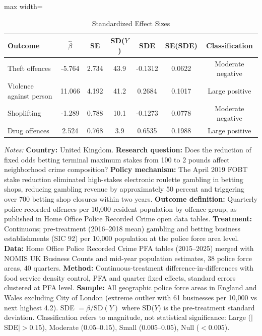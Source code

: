 \begin{table}[htbp]
\centering
\caption{Standardized Effect Sizes}
\label{tab:sde}
\begin{threeparttable}
\begin{adjustbox}{max width=\textwidth}
\begin{tabular}{lcccccc}
\toprule
Outcome & $\hat{\beta}$ & SE & SD($Y$) & SDE & SE(SDE) & Classification \\
\midrule
Theft offences & -5.764 & 2.734 & 43.9 & -0.1312 & 0.0622 & Moderate negative \\
Violence against person & 11.066 & 4.192 & 41.2 & 0.2684 & 0.1017 & Large positive \\
Shoplifting & -1.289 & 0.788 & 10.1 & -0.1273 & 0.0778 & Moderate negative \\
Drug offences & 2.524 & 0.768 & 3.9 & 0.6535 & 0.1988 & Large positive \\
\bottomrule
\end{tabular}
\end{adjustbox}
\begin{tablenotes}[flushleft]\footnotesize
\item \textit{Notes:} \textbf{Country:} United Kingdom. \textbf{Research question:} Does the reduction of fixed odds betting terminal maximum stakes from 100 to 2 pounds affect neighborhood crime composition? \textbf{Policy mechanism:} The April 2019 FOBT stake reduction eliminated high-stakes electronic roulette gambling in betting shops, reducing gambling revenue by approximately 50 percent and triggering over 700 betting shop closures within two years. \textbf{Outcome definition:} Quarterly police-recorded offences per 10,000 resident population by offence group, as published in Home Office Police Recorded Crime open data tables. \textbf{Treatment:} Continuous; pre-treatment (2016--2018 mean) gambling and betting business establishments (SIC 92) per 10,000 population at the police force area level. \textbf{Data:} Home Office Police Recorded Crime PFA tables (2015--2025) merged with NOMIS UK Business Counts and mid-year population estimates, 38 police force areas, 40 quarters. \textbf{Method:} Continuous-treatment difference-in-differences with food service density control, PFA and quarter fixed effects, standard errors clustered at PFA level. \textbf{Sample:} All geographic police force areas in England and Wales excluding City of London (extreme outlier with 61 businesses per 10,000 vs next highest 4.2). SDE $= \hat{\beta} / \text{SD}(Y)$ where SD($Y$) is the pre-treatment standard deviation. Classification refers to magnitude, not statistical significance: Large ($|$SDE$| > 0.15$), Moderate ($0.05$--$0.15$), Small ($0.005$--$0.05$), Null ($< 0.005$).
\end{tablenotes}
\end{threeparttable}
\end{table}
